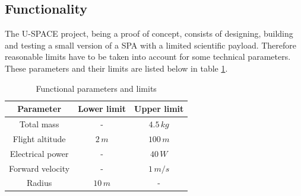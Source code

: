 \subsection{Functionality}
%
The \ac{U-SPACE} project, being a proof of concept, consists of designing, building and testing a small version of a \ac{SPA} with a limited scientific payload. Therefore reasonable limits have to be taken into account for some technical parameters. These parameters and their limits are listed below in table \ref{tab:functionality}.
%
\begin{table}[H]
\centering
\caption{Functional parameters and limits}
\label{tab:functionality}
\begin{tabular}{c c c}
\hline
\textbf{Parameter} & \textbf{Lower limit} & \textbf{Upper limit}\\ \hline
Total mass & - & $4.5\,kg$\\
Flight altitude & $2\,m$ & $100\,m$\\
Electrical power & - & $40\,W$\\
Forward velocity & - & $1\,m/s$\\
Radius & $10\,m$ & -\\
\hline
\end{tabular}
\end{table}
%
